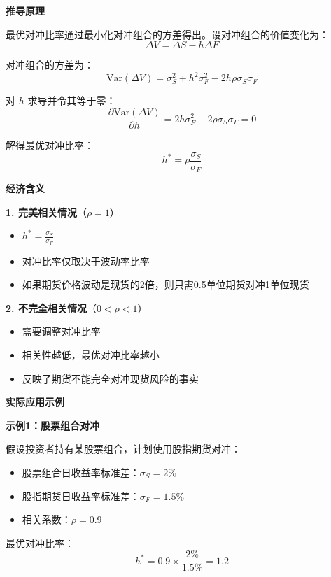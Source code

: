 \textbf{推导原理}

最优对冲比率通过最小化对冲组合的方差得出。设对冲组合的价值变化为：
\begin{equation}
\Delta V = \Delta S - h \Delta F
\end{equation}

对冲组合的方差为：
\begin{equation}
\text{Var}(\Delta V) = \sigma_S^2 + h^2\sigma_F^2 - 2h\rho\sigma_S\sigma_F
\end{equation}

对 $h$ 求导并令其等于零：
\begin{equation}
\frac{\partial \text{Var}(\Delta V)}{\partial h} = 2h\sigma_F^2 - 2\rho\sigma_S\sigma_F = 0
\end{equation}

解得最优对冲比率：
\begin{equation}
h^* = \rho \frac{\sigma_S}{\sigma_F}
\end{equation}

\textbf{经济含义}

\textbf{1. 完美相关情况}（$\rho = 1$）
\begin{itemize}
    \item $h^* = \frac{\sigma_S}{\sigma_F}$
    \item 对冲比率仅取决于波动率比率
    \item 如果期货价格波动是现货的2倍，则只需0.5单位期货对冲1单位现货
\end{itemize}

\textbf{2. 不完全相关情况}（$0 < \rho < 1$）
\begin{itemize}
    \item 需要调整对冲比率
    \item 相关性越低，最优对冲比率越小
    \item 反映了期货不能完全对冲现货风险的事实
\end{itemize}

\textbf{实际应用示例}

\textbf{示例1：股票组合对冲}

假设投资者持有某股票组合，计划使用股指期货对冲：
\begin{itemize}
    \item 股票组合日收益率标准差：$\sigma_S = 2\%$
    \item 股指期货日收益率标准差：$\sigma_F = 1.5\%$
    \item 相关系数：$\rho = 0.9$
\end{itemize}

最优对冲比率：
\begin{equation}
h^* = 0.9 \times \frac{2\%}{1.5\%} = 1.2
\end{equation}

